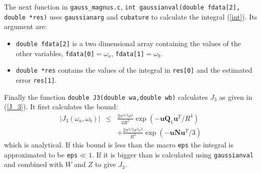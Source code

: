 \documentclass[10pt,letterpaper]{article}
\begin{document}
The next function in \verb|gauss_magnus.c|, \verb|int gaussianval(double fdata[2], double *res)| uses \verb|gaussianarg| and \verb|cubature| to calculate the integral (\ref{int}). Its argument are:
\begin{itemize}
\item \verb|double fdata[2]| is a two dimensional array containing the values of the other variables, \verb|fdata[0]|$=\omega_a$, \verb|fdata[1]|$=\omega_b$.
\item \verb|double *res| contains the values of the integral in \verb|res[0]| and the estimated error \verb|res[1]|.
\end{itemize}
Finally the function \verb|double J3(double wa,double wb)| calculates $J_3$ as given in (\ref{J_3}). It first calculates the bound:
\begin{eqnarray}
|J_3(\omega_a,\omega_b)| &\leq& \frac{2\pi^{3/2} \sigma^3}{3 R^2} \exp\left(-\mathbf{u}\mathbf{Q}_1\mathbf{u}^T/R^4 \right)\\
&&+\frac{2 \pi^{3/2}\sigma^3 \varepsilon^3}{R^2} \exp\left(-\mathbf{u} \mathbf{N} \mathbf{u}^T/3\right)
\end{eqnarray}
which is analytical. If this bound is less than the macro \verb|eps| the integral is approximated to be \verb|eps|$\ll 1$. If it is bigger than is calculated using \verb|gaussianval| and combined with $W$ and $Z$ to give $J_3$.
\end{document}
